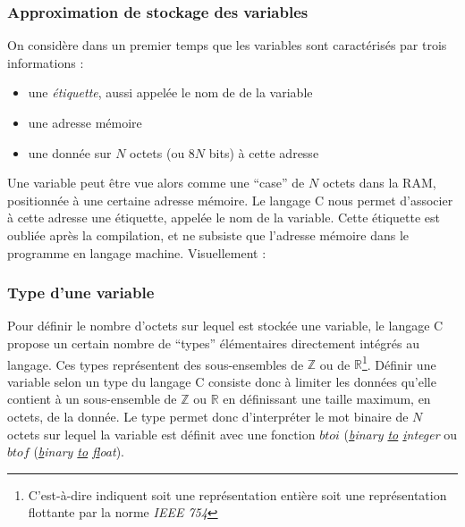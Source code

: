 \documentclass[../../../main.tex]{subfiles}
\begin{document}
\subsubsection{Approximation de stockage des variables}
 
On considère dans un premier temps que les variables sont caractérisés par trois informations :
\begin{itemize}
	\item une \textit{étiquette}, aussi appelée le nom de de la variable
	\item une adresse mémoire
	\item une donnée sur $N$ octets (ou $8N$ bits) à cette adresse
\end{itemize}
Une variable peut être vue alors comme une ``case'' de $N$ octets dans la RAM, positionnée à une certaine adresse mémoire. Le langage C nous permet d'associer à cette adresse une étiquette, appelée le nom de la variable. Cette étiquette est oubliée après la compilation, et ne subsiste que l'adresse mémoire dans le programme en langage machine.\newline
Visuellement :

\begin{minipage}{\textwidth}
	\begin{center}
		
		\label{img:variable}
	\end{center}
\end{minipage}
 
\subsubsection{Type d'une variable}
Pour définir le nombre d'octets sur lequel est stockée une variable, le langage C propose un certain nombre de ``types'' élémentaires directement intégrés au langage. Ces types représentent des sous-ensembles de $\mathbb{Z}$ ou de $\mathbb{R}$\footnote{C'est-à-dire indiquent soit une représentation entière soit une représentation flottante par la norme \textit{IEEE 754}}. Définir une variable selon un type du langage C consiste donc à limiter les données qu'elle contient à un sous-ensemble de $\mathbb{Z}$ ou $\mathbb{R}$ en définissant une taille maximum, en octets, de la donnée. Le type permet donc \og d'interpréter \fg{} le mot binaire de $N$ octets sur lequel la variable est définit avec une fonction $btoi$ (\textit{\underline{b}inary \underline{to} \underline{i}nteger} ou $btof$ (\textit{\underline{b}inary \underline{to} \underline{f}loat}).
 
\end{document}
